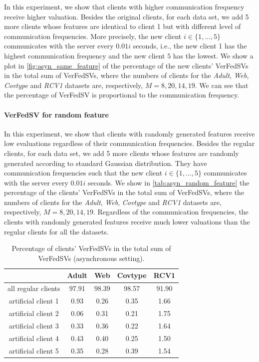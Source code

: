 In this experiment, we show that clients with higher communication frequency receive higher valuation. Besides the original clients, for each data set, we add 5 more clients whose features are identical to client 1 but with different level of communication frequencies. More precisely, the new client $i \in \{1,\dots,5\}$ communicates with the server every $0.01i$ seconds, i.e., the new client 1 has the highest communication frequency and the new client $5$ has the lowest. We show a plot in \autoref{fig:asyn_same_feature} of the percentage of the new clients' VerFedSVs in the total sum of VerFedSVs, where the numbers of clients for the \emph{Adult}, \emph{Web}, \emph{Covtype} and \emph{RCV1} datasets are, respectively, $M = 8, 20, 14, 19$. We can see that the percentage of VerFedSV is proportional to the communication frequency. 

\paragraph{VerFedSV for random feature}
In this experiment, we show that clients with randomly generated features receive low evaluations regardless of their communication frequencies. Besides the regular clients, for each data set, we add 5 more clients whose features are randomly generated according to standard Gaussian distribution. They have communication frequencies such that the new client $i \in \{1,\dots,5\}$ communicates with the server every $0.01i$ seconds. We show in \autoref{tab:asyn_random_feature} the percentage of the clients' VerFedSVs in the total sum of VerFedSVs, where the numbers of clients for the \emph{Adult}, \emph{Web}, \emph{Covtype} and \emph{RCV1} datasets are, respectively, $M = 8, 20, 14, 19$. Regardless of the communication frequencies, the clients with randomly generated features receive much lower valuations than the regular clients for all the datasets.
\begin{table}[t]
    \centering
    \begin{tabular}{ccccc}
    \toprule
                         & Adult & Web   & Covtype  & RCV1\\ \midrule
     all regular clients & 97.91 & 98.39 & 98.57    & 91.90\\
     artificial client 1 & 0.93  & 0.26  & 0.35     & 1.66\\
     artificial client 2 & 0.06  & 0.31  & 0.21     & 1.75\\
     artificial client 3 & 0.33  & 0.36  & 0.22     & 1.64\\
     artificial client 4 & 0.43  & 0.40  & 0.25     & 1.50\\
     artificial client 5 & 0.35  & 0.28  & 0.39     & 1.54\\
    \bottomrule
    \end{tabular}
    \caption{Percentage of clients' VerFedSVs in the total sum of VerFedSVs (asynchronous setting).}
    \label{tab:asyn_random_feature}
\end{table}

